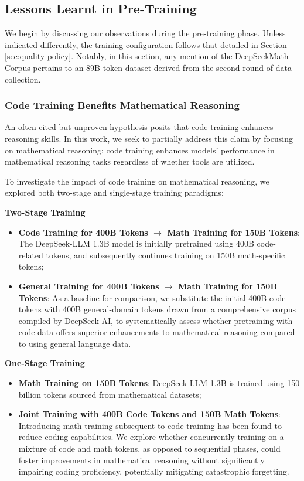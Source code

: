 \begin{itemize}[topsep=0pt]
\subsection{Lessons Learnt in Pre-Training}

We begin by discussing our observations during the pre-training phase. Unless indicated differently, the training configuration follows that detailed in Section \ref{sec:quality-policy}. Notably, in this section, any mention of the DeepSeekMath Corpus pertains to an 89B-token dataset derived from the second round of data collection.

\subsubsection{Code Training Benefits Mathematical Reasoning}

An often-cited but unproven hypothesis posits that code training enhances reasoning skills. In this work, we seek to partially address this claim by focusing on mathematical reasoning: code training enhances models’ performance in mathematical reasoning tasks regardless of whether tools are utilized.

To investigate the impact of code training on mathematical reasoning, we explored both two-stage and single-stage training paradigms:

\textbf{Two-Stage Training}

\begin{itemize}[topsep=0pt]
    \item \textbf{Code Training for 400B Tokens $\rightarrow$ Math Training for 150B Tokens}: The DeepSeek-LLM 1.3B model is initially pretrained using 400B code-related tokens, and subsequently continues training on 150B math-specific tokens;
    \item \textbf{General Training for 400B Tokens $\rightarrow$ Math Training for 150B Tokens}: As a baseline for comparison, we substitute the initial 400B code tokens with 400B general-domain tokens drawn from a comprehensive corpus compiled by DeepSeek-AI, to systematically assess whether pretraining with code data offers superior enhancements to mathematical reasoning compared to using general language data.
\end{itemize}

\textbf{One-Stage Training}

\begin{itemize}[topsep=0pt]
    \item \textbf{Math Training on 150B Tokens}: DeepSeek-LLM 1.3B is trained using 150 billion tokens sourced from mathematical datasets;
    \item \textbf{Joint Training with 400B Code Tokens and 150B Math Tokens}: Introducing math training subsequent to code training has been found to reduce coding capabilities. We explore whether concurrently training on a mixture of code and math tokens, as opposed to sequential phases, could foster improvements in mathematical reasoning without significantly impairing coding proficiency, potentially mitigating catastrophic forgetting.
\end{itemize}


\end{itemize}
